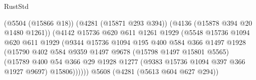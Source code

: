 \begin{lexlean}{RustStd}
\begin{coremodule}
                                                (@5504 (@15866 @18))
                                                (@4281 (@15871 @293 @394))
                                                (@4136 (@15878 @394 @20 @1480 @1261))
                                                (@4142
                                                  @15736
                                                  @620
                                                  @611
                                                  @1261
                                                  @1929
                                                  (@5548
                                                    @15736
                                                    @1094
                                                    @620
                                                    @611
                                                    @1929
                                                    (@9344
                                                      @15736
                                                      @1094
                                                      @195
                                                      @400
                                                      @584
                                                      @366
                                                      @1497
                                                      @1928
                                                      (@15790
                                                        @402
                                                        @584
                                                        @9359
                                                        @1497
                                                        @9678
                                                        (@15798 @1497 @15801 @5565)
                                                        (@15789
                                                          @400
                                                          @54
                                                          @366
                                                          @29
                                                          @1928
                                                          @1277
                                                          (@9383 @15736 @1094 @397 @366 @1927 @9697)
                                                          @15806))))))
                                              @5608
                                              (@4281 (@5613 @604 @627 @294))

\end{coremodule}
\end{lexlean}
